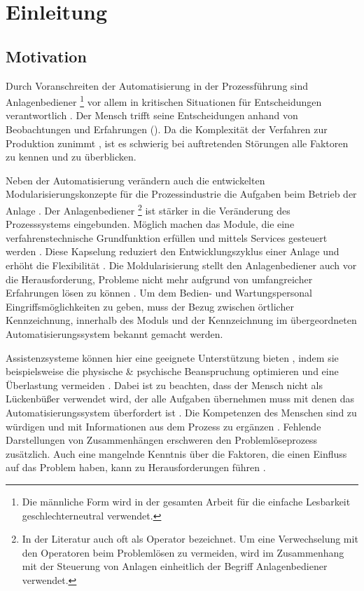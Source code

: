 
\chapter{Einleitung}
\label{sec:Einleitung}
\section{Motivation}
Durch Voranschreiten der Automatisierung in der Prozessführung sind Anlagenbediener \footnote{Die männliche Form wird in der gesamten Arbeit für die einfache Lesbarkeit geschlechterneutral verwendet.} vor allem in kritischen Situationen für Entscheidungen verantwortlich \cite{Bainbridge1983}. Der Mensch trifft seine Entscheidungen anhand von Beobachtungen und Erfahrungen (). Da die Komplexität der Verfahren zur Produktion zunimmt \cite{Poetter2007}, ist es schwierig bei auftretenden Störungen alle Faktoren zu kennen und zu überblicken. 

Neben der Automatisierung verändern auch die entwickelten Modularisierungskonzepte für die Prozessindustrie die Aufgaben beim Betrieb der Anlage \cite{Muller2017}. Der Anlagenbediener \footnote{In der Literatur auch oft als Operator bezeichnet. Um eine Verwechselung mit den Operatoren beim Problemlösen zu vermeiden, wird im Zusammenhang mit der Steuerung von Anlagen einheitlich der Begriff Anlagenbediener verwendet.} ist stärker in die Veränderung des Prozesssystems eingebunden. Möglich machen das Module, die eine verfahrenstechnische Grundfunktion erfüllen und mittels Services gesteuert werden \cite{Bloch2017}. Diese Kapselung reduziert den Entwicklungszyklus einer Anlage und erhöht die Flexibilität \cite{ZVEI2015}. Die Moldularisierung stellt den Anlagenbediener auch vor die Herausforderung, Probleme nicht mehr aufgrund von umfangreicher Erfahrungen  lösen zu können \cite{Muller2018}. \glqq Um dem Bedien- und Wartungspersonal Eingriffsmöglichkeiten zu geben, muss der Bezug zwischen örtlicher Kennzeichnung, innerhalb des Moduls und der Kennzeichnung im übergeordneten Automatisierungssystem bekannt gemacht werden.\grqq \ \citep[28]{Obst2013}

Assistenzsysteme können hier eine geeignete Unterstützung bieten \cite{Dalgleish2007}, indem sie beispielsweise die physische \& psychische Beanspruchung optimieren und eine Überlastung vermeiden \cite{Weisner2018}. Dabei ist zu beachten, dass der Mensch nicht als Lückenbüßer verwendet wird, der alle Aufgaben übernehmen muss mit denen das Automatisierungssystem überfordert ist \cite{Dalgleish2007}. Die Kompetenzen des Menschen sind zu würdigen und mit Informationen aus dem Prozess zu ergänzen \cite{Weisner2018}. Fehlende Darstellungen von Zusammenhängen erschweren den Problemlöseprozess zusätzlich. Auch eine mangelnde Kenntnis über die Faktoren, die einen Einfluss auf das Problem haben, kann zu Herausforderungen führen \cite{Herczeg2003}.

